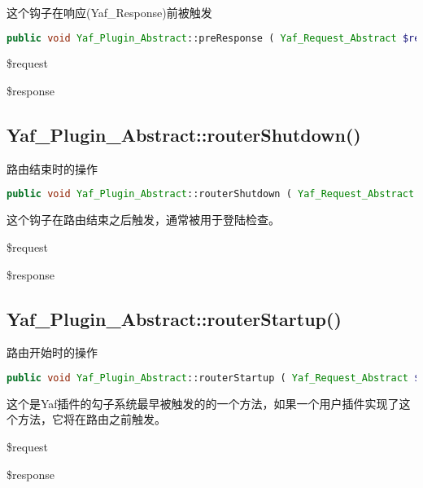 这个钩子在响应(Yaf\_Response)前被触发



\begin{lstlisting}[language=PHP]
public void Yaf_Plugin_Abstract::preResponse ( Yaf_Request_Abstract $request , Yaf_Response_Abstract $response )
\end{lstlisting}

\begin{compactitem}
\item \$request
\item \$response
\end{compactitem}

\subsection{Yaf\_Plugin\_Abstract::routerShutdown()}

路由结束时的操作






\begin{lstlisting}[language=PHP]
public void Yaf_Plugin_Abstract::routerShutdown ( Yaf_Request_Abstract $request , Yaf_Response_Abstract $response )
\end{lstlisting}

这个钩子在路由结束之后触发，通常被用于登陆检查。

\begin{compactitem}
\item \$request
\item \$response
\end{compactitem}


\subsection{Yaf\_Plugin\_Abstract::routerStartup()}

路由开始时的操作


\begin{lstlisting}[language=PHP]
public void Yaf_Plugin_Abstract::routerStartup ( Yaf_Request_Abstract $request , Yaf_Response_Abstract $response )
\end{lstlisting}

这个是Yaf插件的勾子系统最早被触发的的一个方法，如果一个用户插件实现了这个方法，它将在路由之前触发。


\begin{compactitem}
\item \$request
\item \$response
\end{compactitem}

